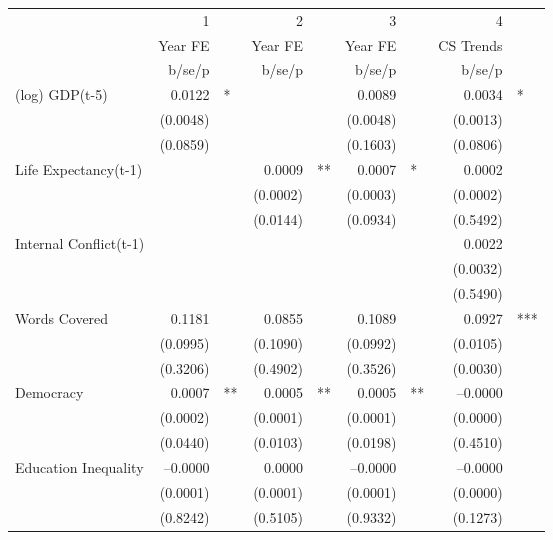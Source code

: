 \begin{tabular} {l* {4}{r @{} l}}
\hline
            &           1&   &           2&   &           3&   &           4&   \\
            &     Year FE&   &     Year FE&   &     Year FE&   &   CS Trends&   \\
            &      b/se/p&   &      b/se/p&   &      b/se/p&   &      b/se/p&   \\
\hline
(log) GDP(t-5)&      0.0122&*  &            &   &      0.0089&   &      0.0034&*  \\
            &    (0.0048)&   &            &   &    (0.0048)&   &    (0.0013)&   \\
            &    (0.0859)&   &            &   &    (0.1603)&   &    (0.0806)&   \\
Life Expectancy(t-1) &            &   &      0.0009&** &      0.0007&*  &      0.0002&   \\
            &            &   &    (0.0002)&   &    (0.0003)&   &    (0.0002)&   \\
            &            &   &    (0.0144)&   &    (0.0934)&   &    (0.5492)&   \\
Internal Conflict(t-1)&            &   &            &   &            &   &      0.0022&   \\
            &            &   &            &   &            &   &    (0.0032)&   \\
            &            &   &            &   &            &   &    (0.5490)&   \\
Words Covered&      0.1181&   &      0.0855&   &      0.1089&   &      0.0927&***\\
            &    (0.0995)&   &    (0.1090)&   &    (0.0992)&   &    (0.0105)&   \\
            &    (0.3206)&   &    (0.4902)&   &    (0.3526)&   &    (0.0030)&   \\
Democracy   &      0.0007&** &      0.0005&** &      0.0005&** &    --0.0000&   \\
            &    (0.0002)&   &    (0.0001)&   &    (0.0001)&   &    (0.0000)&   \\
            &    (0.0440)&   &    (0.0103)&   &    (0.0198)&   &    (0.4510)&   \\
Education Inequality&    --0.0000&   &      0.0000&   &    --0.0000&   &    --0.0000&   \\
            &    (0.0001)&   &    (0.0001)&   &    (0.0001)&   &    (0.0000)&   \\
            &    (0.8242)&   &    (0.5105)&   &    (0.9332)&   &    (0.1273)&   \\

\end{tabular}
